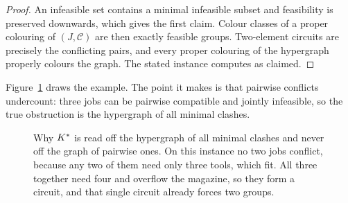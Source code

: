 \begin{proof}
An infeasible set contains a minimal infeasible subset and feasibility is preserved
downwards, which gives the first claim. Colour classes of a proper colouring of
$(J,\mathcal{C})$ are then exactly feasible groups. Two-element circuits are precisely
the conflicting pairs, and every proper colouring of the hypergraph properly colours
the graph. The stated instance computes as claimed.
\end{proof}

Figure~\ref{fig:hypergraph} draws the example. The point it makes is that pairwise
conflicts undercount: three jobs can be pairwise compatible and jointly infeasible,
so the true obstruction is the hypergraph of all minimal clashes.

\begin{figure}[ht]\centering
{}
\caption{Why $K^{\ast}$ is read off the hypergraph of all minimal clashes and never off
the graph of pairwise ones. On this instance no two jobs conflict, because any two of
them need only three tools, which fit. All three together need four and overflow the
magazine, so they form a circuit, and that single circuit already forces two groups.}
\label{fig:hypergraph}
\end{figure}

